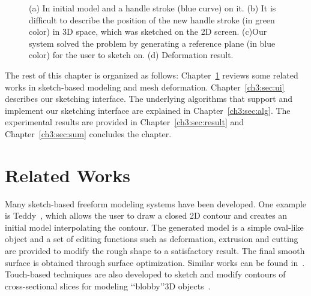 \begin{figure} [htbp]
  \centering
  \caption{(a) In initial model and a handle stroke (blue curve) on it. (b) It is difficult to describe the position of the new handle stroke (in green color) in 3D space, which was sketched on the 2D screen. (c)Our system solved the problem by generating a reference plane (in blue color) for the user to sketch on. (d) Deformation result.}
  \label{fig:screendeformpro} %
\end{figure}

The rest of this chapter is organized as follows: Chapter~\ref{ch3:sec:review} reviews some related works in sketch-based modeling and mesh deformation. Chapter~\ref{ch3:sec:ui} describes our sketching interface. The underlying algorithms that support and implement our sketching interface are explained in Chapter~\ref{ch3:sec:alg}. The experimental results are provided in Chapter~\ref{ch3:sec:result} and Chapter~\ref{ch3:sec:sum} concludes the chapter.

\section{Related Works}\label{ch3:sec:review}

Many sketch-based freeform modeling systems have been developed. One example is Teddy~\cite{IMT99}, which allows the user to draw a closed 2D contour and creates an initial model interpolating the contour. The generated model is a
simple oval-like object and a set of editing functions such as deformation, extrusion and cutting are provided to modify the rough shape to a satisfactory result. The final smooth surface is obtained through surface optimization. Similar works can be found in~\cite{KHR02,NISA07}. Touch-based techniques are also developed to sketch and modify contours of cross-sectional slices for modeling \lq\lq{blobby}\rq\rq 3D objects~\cite{JRPW10}.


